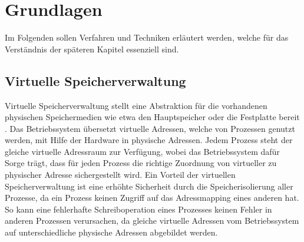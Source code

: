 \chapter{Grundlagen}
\label{chapter:basics}

Im Folgenden sollen Verfahren und Techniken erläutert werden, welche für das Verständnis der späteren Kapitel essenziell sind.

\section{Virtuelle Speicherverwaltung}


Virtuelle Speicherverwaltung stellt eine Abstraktion für die vorhandenen physischen Speichermedien wie etwa den Hauptspeicher oder die Festplatte bereit \cite{tanenbaumVirtualMemory}.
Das Betriebssystem übersetzt virtuelle Adressen, welche von Prozessen genutzt werden, mit Hilfe der Hardware in physische Adressen. 
Jedem Prozess steht der gleiche virtuelle Adressraum zur Verfügung, wobei das Betriebssystem dafür Sorge trägt, dass für jeden Prozess die richtige Zuordnung von virtueller zu physischer Adresse sichergestellt wird.
Ein Vorteil der virtuellen Speicherverwaltung ist eine erhöhte Sicherheit durch die Speicherisolierung aller Prozesse, da ein Prozess keinen Zugriff auf das Adressmapping eines anderen hat.
So kann eine fehlerhafte Schreiboperation eines Prozesses keinen Fehler in anderen Prozessen verursachen, da gleiche virtuelle Adressen vom Betriebssystem auf unterschiedliche physische Adressen abgebildet werden.


